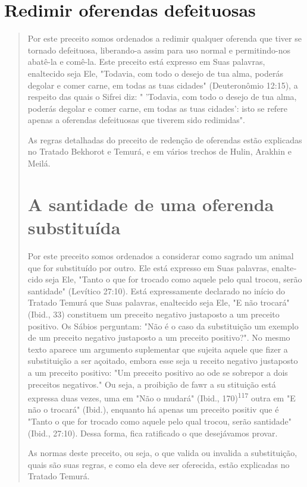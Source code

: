 \section{Redimir oferendas defeituosas}

\begin{quote}
Por este preceito somos ordenados a redimir qualquer oferenda que tiver
se tornado defeituosa, liberando-a assim para uso normal e
permitindo-nos abatê-la e comê-la. Este preceito está expresso em Suas
palavras, enaltecido seja Ele, "Todavia, com todo o desejo de tua alma,
poderás degolar e comer carne, em todas as tuas cidades" (Deuteronômio
12:15), a respeito das quais o Sifrei diz: " 'Todavia, com todo o desejo
de tua alma, poderás degolar e co­mer carne, em todas as tuas cidades':
isto se refere apenas a oferendas defeituo­sas que tiverem sido
redimidas".

As regras detalhadas do preceito de redenção de oferendas estão
ex­plicadas no Tratado Bekhorot e Temurá, e em vários trechos de Hulin,
Arakhin e Meilá.

\section{A santidade de uma oferenda substituída}

Por este preceito somos ordenados a considerar como sagrado um animal
que for substituído por outro. Ele está expresso em Suas palavras,
enalte­cido seja Ele, "Tanto o que for trocado como aquele pelo qual
trocou, serão san­tidade" (Levítico 27:10). Está expressamente declarado
no início do Tratado Te­murá que Suas palavras, enaltecido seja Ele, "E
não trocará" (Ibid., 33) consti­tuem um preceito negativo justaposto a
um preceito positivo. Os Sábios pergun­tam: "Não é o caso da
substituição um exemplo de um preceito negativo justa­posto a um
preceito positivo?". No mesmo texto aparece um argumento suple­mentar
que sujeita aquele que fizer a substituição a ser açoitado, embora esse
seja u receito negativo justaposto a um preceito positivo: "Um preceito
posi­tivo ao ode se sobrepor a dois preceitos negativos." Ou seja, a
proibição de fawr a su stituição está expressa duas vezes, uma em "Não o
mudará" (Ibid., 170)\textsuperscript{117} outra em "E não o trocará"
(Ibid.), enquanto há apenas um preceito positiv que é "Tanto o que for
trocado como aquele pelo qual trocou, serão santidade" (Ibid., 27:10).
Dessa forma, fica ratificado o que desejávamos provar.

As normas deste preceito, ou seja, o que valida ou invalida a
substi­tuição, quais são suas regras, e como ela deve ser oferecida,
estão explicadas no Tratado Temurá.



\end{quote}

